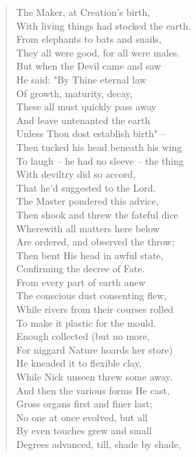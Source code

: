 \documentclass[11pt]{article}
\begin{document}
\begin{quote}   The Maker, at Creation's birth, \\
  With living things had stocked the earth. \\
  From elephants to bats and snails, \\
  They all were good, for all were males. \\
  But when the Devil came and saw \\
  He said:  "By Thine eternal law \\
  Of growth, maturity, decay, \\
  These all must quickly pass away \\
  And leave untenanted the earth \\
  Unless Thou dost establish birth" -- \\
  Then tucked his head beneath his wing \\
  To laugh -- he had no sleeve -- the thing \\
  With deviltry did so accord, \\
  That he'd suggested to the Lord. \\
  The Master pondered this advice, \\
  Then shook and threw the fateful dice \\
  Wherewith all matters here below \\
  Are ordered, and observed the throw; \\
  Then bent His head in awful state, \\
  Confirming the decree of Fate. \\
  From every part of earth anew \\
  The conscious dust consenting flew, \\
  While rivers from their courses rolled \\
  To make it plastic for the mould. \\
  Enough collected (but no more, \\
  For niggard Nature hoards her store) \\
  He kneaded it to flexible clay, \\
  While Nick unseen threw some away. \\
  And then the various forms He cast, \\
  Gross organs first and finer last; \\
  No one at once evolved, but all \\
  By even touches grew and small \\
  Degrees advanced, till, shade by shade, \\

\end{quote}
\end{document}
